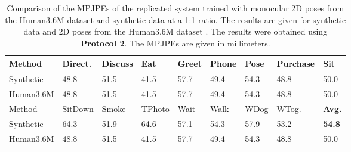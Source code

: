 \begin{table}[]	
	\centering
	\begin{tabularx}{\textwidth}{l *{8}{Y}}
		\toprule
		Method & Direct. & Discuss & Eat & Greet & Phone & Pose & Purchase & Sit \\
		\midrule
		Synthetic & 48.8 & 51.5 & 41.5 & 57.7 & 49.4 & 54.3 & 48.8 & 50.0 \\
		Human3.6M & 48.8 & 51.5 & 41.5 & 57.7 & 49.4 & 54.3 & 48.8 & 50.0 \\
		\bottomrule
		\toprule
		Method & SitDown & Smoke & TPhoto & Wait & Walk & WDog & WTog. & \textbf{Avg.}\\
		\midrule
		Synthetic & 64.3 & 51.9 & 64.6 & 57.1 & 54.3 & 57.9 & 53.2 & \textbf{54.8} \\
		Human3.6M & 48.8 & 51.5 & 41.5 & 57.7 & 49.4 & 54.3 & 48.8 & 50.0 \\
		\bottomrule
	\end{tabularx}
	\caption{
		Comparison of the MPJPEs of the replicated system trained with monocular 2D poses from the Human3.6M dataset and synthetic data at a 1:1 ratio.
		The results are given for synthetic data and 2D poses from the Human3.6M dataset \cite{ionescu14}.
		The results were obtained using \textbf{Protocol 2}. The MPJPEs are given in millimeters.
	 }
	\label{tbl:results-real-and-synthetic-protocol2}
	\info[inline]{}
\end{table}